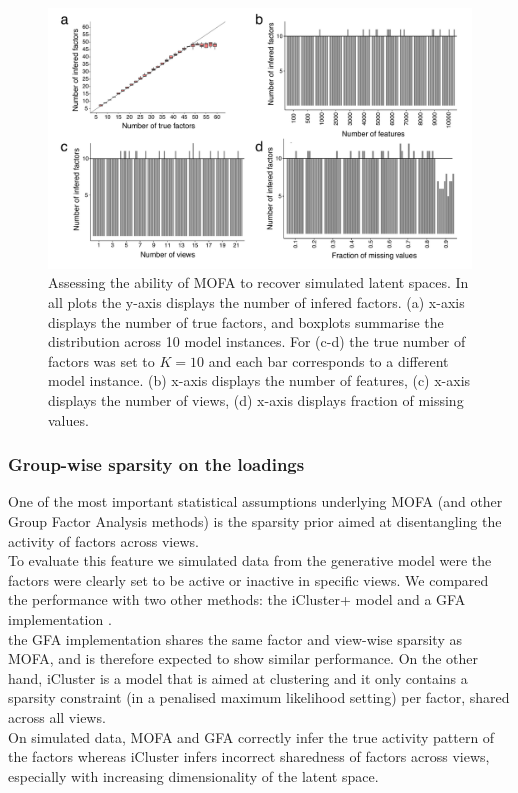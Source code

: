\begin{figure}[H]
	\centering 	
	\includegraphics[width=1.0\textwidth]{MOFA_learnK}
	\caption{Assessing the ability of MOFA to recover simulated latent spaces. In all plots the y-axis displays the number of infered factors. (a) x-axis displays the number of true factors, and boxplots summarise the distribution across 10 model instances. For (c-d) the true number of factors was set to $K=10$ and each bar corresponds to a different model instance. (b) x-axis displays the number of features, (c) x-axis displays the number of views, (d) x-axis displays fraction of missing values. }
	\label{fig:MOFA_learnK}
\end{figure}

\subsubsection{Group-wise sparsity on the loadings}
One of the most important statistical assumptions underlying MOFA (and other Group Factor Analysis methods) is the sparsity prior aimed at disentangling the activity of factors across views.\\
To evaluate this feature we simulated data from the generative model were the factors were clearly set to be active or inactive in specific views. We compared the performance with two other methods: the iCluster+ model \cite{Mo2013} and a GFA implementation \cite{Leppaaho2017}.\\
the GFA implementation shares the same factor and view-wise sparsity as MOFA, and is therefore expected to show similar performance. On the other hand, iCluster is a model that is aimed at clustering and it only contains a sparsity constraint (in a penalised maximum likelihood setting) per factor, shared across all views.\\
On simulated data, MOFA and GFA correctly infer the true activity pattern of the factors whereas iCluster infers incorrect sharedness of factors across views, especially with increasing dimensionality of the latent space.

